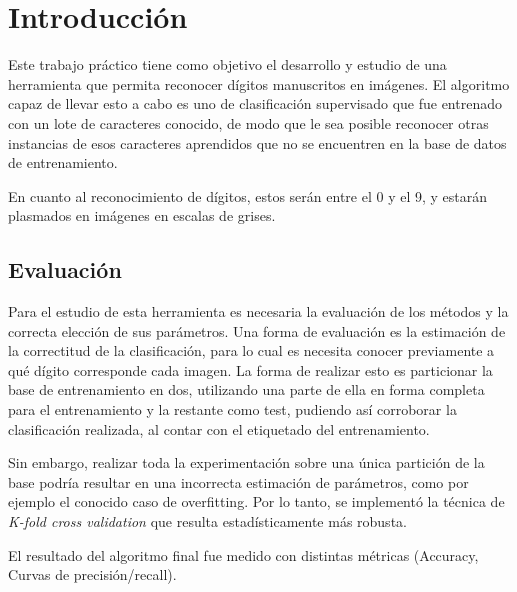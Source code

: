 \section{Introducción}

Este trabajo práctico tiene como objetivo el desarrollo y estudio de una herramienta que permita reconocer dígitos manuscritos en imágenes. El algoritmo capaz de llevar esto a cabo es uno de clasificación supervisado que fue entrenado con un lote de caracteres conocido, de modo que le sea posible reconocer otras instancias de esos caracteres aprendidos que no se encuentren en la base de datos de entrenamiento.

En cuanto al reconocimiento de dígitos, estos serán entre el 0 y el 9, y estarán plasmados en imágenes en escalas de grises.

\subsection{Evaluación}

Para el estudio de esta herramienta es necesaria la evaluación de los métodos y la correcta elección de sus parámetros. Una forma de evaluación es la estimación de la correctitud de la clasificación, para lo cual es necesita conocer previamente a qué dígito corresponde cada imagen. La forma de realizar esto es particionar la base de entrenamiento en dos, utilizando una parte de ella en forma completa para el entrenamiento y la restante como test, pudiendo así corroborar la clasificación realizada, al contar con el etiquetado del entrenamiento.

Sin embargo, realizar toda la experimentación sobre una única partición de la base podría resultar en una incorrecta estimación de parámetros, como por ejemplo el conocido caso de overfitting. Por lo tanto, se implementó la técnica de \textit{K-fold cross validation} que resulta estadísticamente más robusta.

El resultado del algoritmo final fue medido con distintas métricas (Accuracy, Curvas de precisión/recall).

